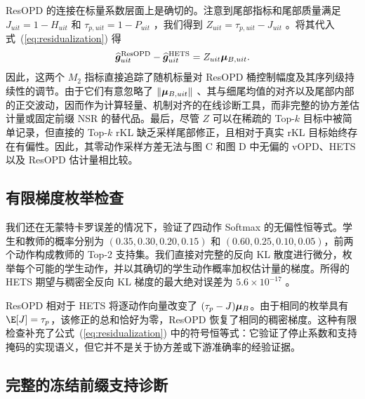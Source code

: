 ResOPD 的连接在标量系数层面上是确切的。注意到尾部指标和尾部质量满足 $J_{uit} = 1 - H_{uit}$ 和 $\tau_{p,uit} = 1 - P_{uit}$ ，我们得到 $Z_{uit} = \tau_{p,uit} - J_{uit}$ 。将其代入式~(\ref{eq:residualization}) 得
\begin{equation}
  \widehat{\bm{g}}_{uit}^{\mathrm{ResOPD}} - \widehat{\bm{g}}_{uit}^{\mathrm{HETS}} = Z_{uit} \bm{\mu}_{B,uit}.
  \label{eq:online-residual-cfr-link}
\end{equation}
因此，这两个 $M_2$  指标直接追踪了随机标量对 ResOPD 桶控制幅度及其序列级持续性的调节。由于它们有意忽略了 $\lVert\bm{\mu}_{B,uit}\rVert$ 、其与细尾均值的对齐以及尾部内部的正交波动，因而作为计算轻量、机制对齐的在线诊断工具，而非完整的协方差估计量或固定前缀 NSR 的替代品。最后，尽管 $Z$  可以在稀疏的 Top-$k$  目标中被简单记录，但直接的 Top-$k$  rKL 缺乏采样尾部修正，且相对于真实 rKL 目标始终存在有偏性。因此，其零动作采样方差无法与图 C 和图 D 中无偏的 vOPD、HETS 以及 ResOPD 估计量相比较。


\subsection{有限梯度枚举检查}
\label{app:finite-check}

我们还在无蒙特卡罗误差的情况下，验证了四动作 Softmax 的无偏性恒等式。学生和教师的概率分别为 $(0.35,0.30,0.20,0.15)$ 和 $(0.60,0.25,0.10,0.05)$，前两个动作构成教师的 Top-2 支持集。我们直接对完整的反向 KL 散度进行微分，枚举每个可能的学生动作，并以其确切的学生动作概率加权估计量的梯度。所得的 HETS 期望与稠密全反向 KL 梯度的最大绝对误差为 $5.6\times10^{-17}$ 。

ResOPD 相对于 HETS 将逐动作向量改变了 $(\tau_p-J)\bm{\mu}_B$。由于相同的枚举具有 $\E[J]=\tau_p$，该修正的总和恰好为零，ResOPD 恢复了相同的稠密梯度。这种有限检查补充了公式~(\ref{eq:residualization}) 中的符号恒等式：它验证了停止系数和支持掩码的实现语义，但它并不是关于协方差或下游准确率的经验证据。

\subsection{完整的冻结前缀支持诊断}
\label{app:fixed-prefix-sweep}

